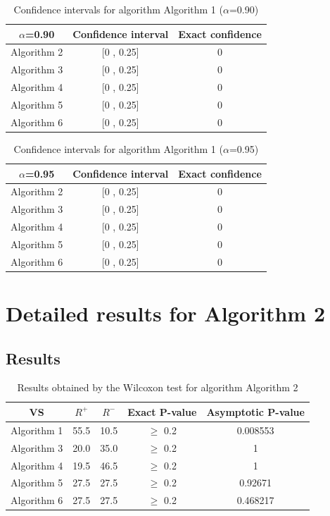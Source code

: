\documentclass[a4paper,10pt]{article}
\begin{document}
\begin{table}[!htp]
\centering\small
\begin{tabular}{
|c|c|c|}
\hline
 $\alpha$=0.90 & Confidence interval & Exact confidence \\ \hline 
Algorithm 2 & [0 , 0.25] & 0\\ \hline 
Algorithm 3 & [0 , 0.25] & 0\\ \hline 
Algorithm 4 & [0 , 0.25] & 0\\ \hline 
Algorithm 5 & [0 , 0.25] & 0\\ \hline 
Algorithm 6 & [0 , 0.25] & 0\\ \hline 

\end{tabular}
\caption{Confidence intervals for algorithm Algorithm 1 ($\alpha$=0.90)}
\end{table}
\begin{table}[!htp]
\centering\small
\begin{tabular}{
|c|c|c|}
\hline
 $\alpha$=0.95 & Confidence interval & Exact confidence \\ \hline 
Algorithm 2 & [0 , 0.25] & 0\\ \hline 
Algorithm 3 & [0 , 0.25] & 0\\ \hline 
Algorithm 4 & [0 , 0.25] & 0\\ \hline 
Algorithm 5 & [0 , 0.25] & 0\\ \hline 
Algorithm 6 & [0 , 0.25] & 0\\ \hline 

\end{tabular}
\caption{Confidence intervals for algorithm Algorithm 1 ($\alpha$=0.95)}
\end{table}

 \clearpage 


\section{Detailed results for Algorithm 2}


\subsection{Results}

\begin{table}[!htp]
\centering\small
\begin{tabular}{
|c|c|c|c|c|}
\hline
 VS & $R^{+}$ & $R^{-}$ & Exact P-value & Asymptotic P-value \\ \hline 
Algorithm 1 & 55.5 & 10.5 & $\geq$ 0.2 & 0.008553\\ \hline 
Algorithm 3 & 20.0 & 35.0 & $\geq$ 0.2 & 1\\ \hline 
Algorithm 4 & 19.5 & 46.5 & $\geq$ 0.2 & 1\\ \hline 
Algorithm 5 & 27.5 & 27.5 & $\geq$ 0.2 & 0.92671\\ \hline 
Algorithm 6 & 27.5 & 27.5 & $\geq$ 0.2 & 0.468217\\ \hline 

\end{tabular}
\caption{Results obtained by the Wilcoxon test for algorithm Algorithm 2}
\end{table}
\end{document}
